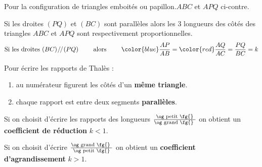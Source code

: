 \documentclass[main.tex]{subfiles}
\begin{document}
\begin{theorem}
	Pour la configuration de triangles emboités ou papillon.$ABC$ et $APQ$ ci-contre. 
	
	Si les droites $(PQ)$ et $(BC)$ sont parallèles alors les 3 longueurs des côtés des triangles $ABC$ et $APQ$ sont respectivement proportionnelles.
	$$\text{Si les droites $(BC)  \mathbin{\!/\mkern-2mu/\!}  (PQ)$  \qquad alors }  \qquad  {\color{blue}\frac{AP}{AB}}={\color{red}\frac{AQ}{AC}}  = \frac{PQ}{BC} =k 
	$$ 
\end{theorem}     
Pour écrire les rapports de Thalès :
\begin{enumerate}[label=\alph*), leftmargin=*]
	\item au numérateur figurent les côtés d'un \textbf{même triangle}.
	\item chaque rapport est entre deux segments \textbf{parallèles}.  
\end{enumerate} 
\begin{remark}
	Si on choisit d'écrire les rapports des longueurs $\frac{\text{\og petit \fg{}}}{\text{\og grand \fg{} }}$ on obtient un \textbf{coefficient de réduction} $k<1$.
	
	Si on choisit d'écrire $\frac{\text{\og grand \fg{} }}{\text{\og petit \fg{}}}$  on obtient un \textbf{coefficient d'agrandissement} $k>1$. 
\end{remark}
\end{document}

